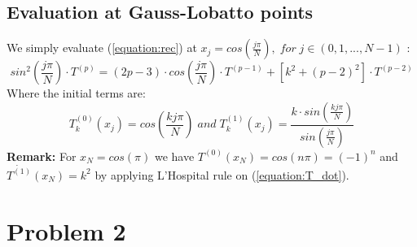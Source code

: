 \documentclass[12pt, a4paper]{article}
\begin{document}
\subsection{Evaluation at Gauss-Lobatto points}
We simply evaluate (\ref{equation:rec}) at $x_{j}=cos(\frac{j\pi}{N}), \; for \; j \in (0,1,...,N-1)$ :
\begin{equation}
	sin^2(\frac{j\pi}{N}) \cdot T^{(p)} = (2p-3) \cdot cos(\frac{j\pi}{N}) \cdot T^{(p-1)} + [k^2 + (p-2)^2] \cdot T^{(p-2)}
\end{equation}
Where the initial terms are: 
\begin{equation}
T_{k}^{(0)}(x_{j})=cos(\frac{kj\pi}{N}) \; and \; T_{k}^{(1)}(x_{j})=\frac{k \cdot sin(\frac{kj\pi}{N})}{sin(\frac{j\pi}{N})}
\label{equation:init}
\end{equation}
\textbf{Remark: } For $x_N=cos(\pi)$ we have $T^{(0)}(x_N)=cos(n\pi)=(-1)^n$ and \\ $\dot{T^{(1)}}(x_N)=k^2$ by applying L'Hospital rule on (\ref{equation:T_dot}).
\newpage

\section{Problem 2}
\end{document}
